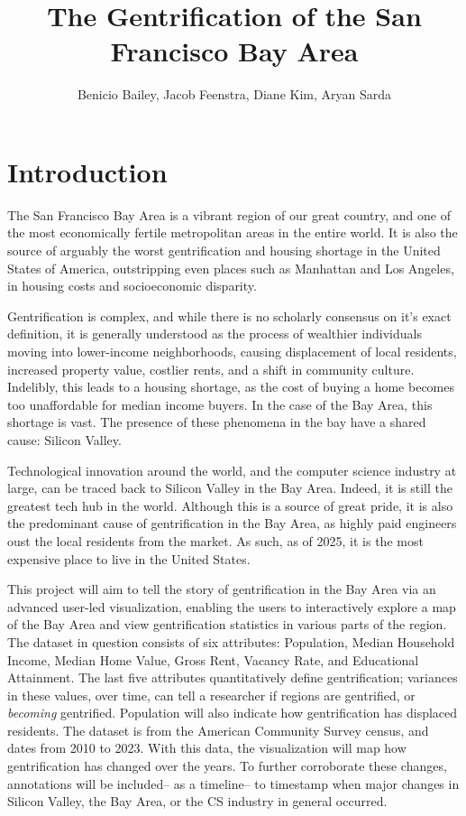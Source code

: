 \documentclass{article}
\title{The Gentrification of the San Francisco Bay Area}
\author{Benicio Bailey, Jacob Feenstra, Diane Kim, Aryan Sarda}
\begin{document}
\maketitle

\section{Introduction}

The San Francisco Bay Area is a vibrant region of our great country, and one of the most economically fertile metropolitan areas in the entire world. It is also the source of arguably the worst gentrification and housing shortage in the United States of America, outstripping even places such as Manhattan and Los Angeles, in housing costs and socioeconomic disparity. 

Gentrification is complex, and while there is no scholarly consensus on it's exact definition, it is generally understood as the process of wealthier individuals moving into lower-income neighborhoods, causing displacement of local residents, increased property value, costlier rents, and a shift in community culture. Indelibly, this leads to a housing shortage, as the cost of buying a home becomes too unaffordable for median income buyers. In the case of the Bay Area, this shortage is vast. The presence of these phenomena in the bay have a shared cause: Silicon Valley.

Technological innovation around the world, and the computer science industry at large, can be traced back to Silicon Valley in the Bay Area. Indeed, it is still the greatest tech hub in the world. Although this is a source of great pride, it is also the predominant cause of gentrification in the Bay Area, as highly paid engineers oust the local residents from the market. As such, as of 2025, it is the most expensive place to live in the United States.

This project will aim to tell the story of gentrification in the Bay Area via an advanced user-led visualization, enabling the users to interactively explore a map of the Bay Area and view gentrification statistics in various parts of the region. The dataset in question consists of six attributes: Population, Median Household Income, Median Home Value, Gross Rent, Vacancy Rate, and Educational Attainment. The last five attributes quantitatively define gentrification; variances in these values, over time, can tell a researcher if regions are gentrified, or \textit{becoming} gentrified. Population will also indicate how gentrification has displaced residents. The dataset is from the American Community Survey census, and dates from 2010 to 2023. With this data, the visualization will map how gentrification has changed over the years. To further corroborate these changes, annotations will be included-- as a timeline-- to timestamp when major changes in Silicon Valley, the Bay Area, or the CS industry in general occurred. 
\end{document}
